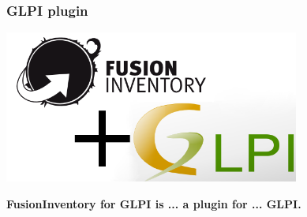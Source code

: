 %
\begin{frame}
    \frametitle{GLPI plugin}

   \includegraphics[height=5cm]{./pics/fusinvglpi.png}

    \bf{FusionInventory for GLPI} is ... \pause a plugin for \pause ... \bf{GLPI}.
\end{frame}

